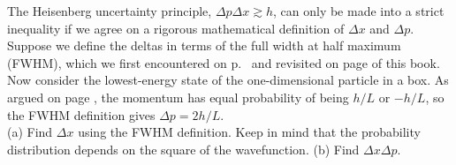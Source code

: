 The Heisenberg uncertainty principle, $\Delta p \Delta x \gtrsim h$, can only be
made into a strict inequality if we agree on a rigorous mathematical definition
of $\Delta x$ and $\Delta p$. Suppose we define the deltas in terms of the
full width at half maximum (FWHM), which we first encountered on p.~\pageref{fwhm}
and revisited on page \pageref{fwhm-recap} of this book. Now consider the lowest-energy
state of the one-dimensional particle in a box. As argued on page
\pageref{delta-p-heisenberg}, the momentum has equal probability of being
$h/L$ or $-h/L$, so the FWHM definition gives $\Delta p=2h/L$.\\
(a) Find $\Delta x$ using the FWHM definition. Keep in mind that the probability
distribution depends on the square of the wavefunction.\hwendpart
(b) Find $\Delta x \Delta p$.\answercheck
